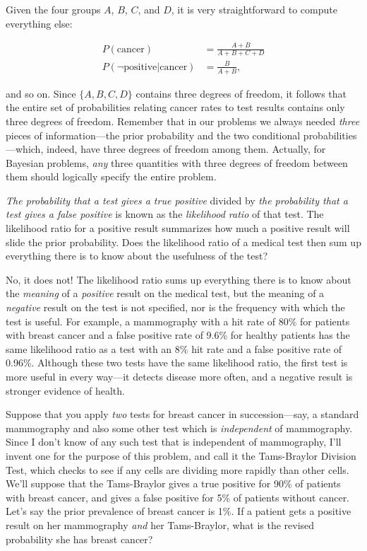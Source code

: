 {{{
 Given the four groups $A$, $B$, $C$, and $D$, it is very straightforward
to compute everything else:}

\begin{align*}
 P(\text{cancer}) &= \frac{A + B}{A + B + C + D} \\
 P(\lnot\text{positive}|\text{cancer}) &= \frac{B}{A + B},
\end{align*}

{
 and so on. Since $\{A,B,C,D\}$
contains three degrees of freedom, it follows that the entire set of
probabilities relating cancer rates to test results contains only three
degrees of freedom. Remember that in our problems we always needed
\textit{three} pieces of information---the prior probability and the
two conditional probabilities---which, indeed, have three degrees of
freedom among them. Actually, for Bayesian problems, \textit{any} three
quantities with three degrees of freedom between them should logically
specify the entire problem.}

\hr

{
 \textit{The probability that a test gives a true positive} divided
by \textit{the probability that a }\textit{test gives a false positive}
is known as the \textit{likelihood ratio} of that test. The likelihood
ratio for a positive result summarizes how much a positive result will
slide the prior probability. Does the likelihood ratio of a medical
test then sum up everything there is to know about the usefulness of
the test?}

{
 No, it does not! The likelihood ratio sums up everything there is
to know about the \textit{meaning} of a \textit{positive} result on the
medical test, but the meaning of a \textit{negative} result on the test
is not specified, nor is the frequency with which the test is useful.
For example, a mammography with a hit rate of 80\% for patients with
breast cancer and a false positive rate of 9.6\% for healthy patients
has the same likelihood ratio as a test with an 8\% hit rate and a
false positive rate of 0.96\%. Although these two tests have the same
likelihood ratio, the first test is more useful in every way---it
detects disease more often, and a negative result is stronger evidence
of health.}

\hr
{
 Suppose that you apply \textit{two} tests for breast cancer in
succession---say, a standard mammography and also some other test which
is \textit{independent} of mammography. Since I don't
know of any such test that is independent of mammography,
I'll invent one for the purpose of this problem, and
call it the Tams-Braylor Division Test, which checks to see if any
cells are dividing more rapidly than other cells. We'll
suppose that the Tams-Braylor gives a true positive for 90\% of
patients with breast cancer, and gives a false positive for 5\% of
patients without cancer. Let's say the prior prevalence
of breast cancer is 1\%. If a patient gets a positive result on her
mammography \textit{and} her Tams-Braylor, what is the revised
probability she has breast cancer?}

}}
